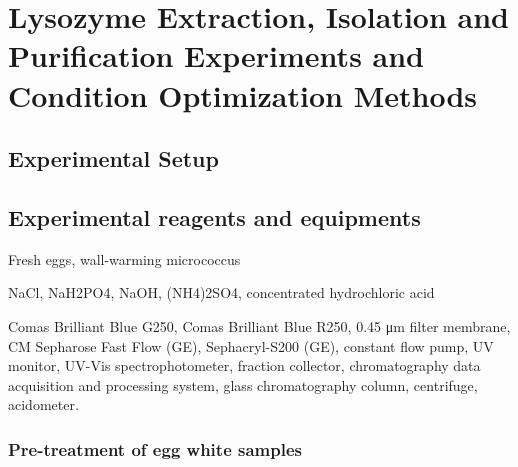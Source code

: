 % 
%
%
% 
%

\chapter{Lysozyme Extraction, Isolation and Purification Experiments and Condition Optimization Methods}

\section{Experimental Setup}

\section{Experimental reagents and equipments}

Fresh eggs, wall-warming micrococcus

NaCl, NaH2PO4, NaOH, (NH4)2SO4, concentrated hydrochloric acid

Comas Brilliant Blue G250, Comas Brilliant Blue R250, 0.45 μm filter
membrane, CM Sepharose Fast Flow (GE), Sephacryl-S200 (GE), constant
flow pump, UV monitor, UV-Vis spectrophotometer, fraction collector,
chromatography data acquisition and processing system, glass
chromatography column, centrifuge, acidometer.

\hypertarget{pre-treatment-of-egg-white-samples}{%
\subsection{Pre-treatment of egg white
	samples}\label{pre-treatment-of-egg-white-samples}}

